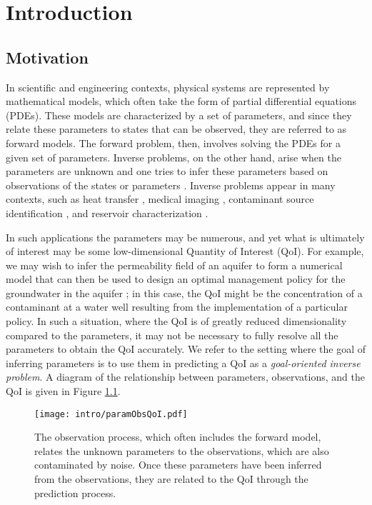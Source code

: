 \chapter{Introduction}

\section{Motivation}  %

In scientific and engineering contexts, physical systems are represented by mathematical models, which often take the form of partial differential equations (PDEs). These models are characterized by a set of parameters, and since they relate these parameters to states that can be observed, they are referred to as forward models. The forward problem, then, involves solving the PDEs for a given set of parameters. Inverse problems, on the other hand, arise when the parameters are unknown and one tries to infer these parameters based on observations of the states or parameters \cite{Taran05, BanksKuhn89}. Inverse problems appear in many contexts, such as heat transfer \cite{Alif94}, medical imaging \cite{Arr99,Ren10}, contaminant source identification \cite{Sun99}, and reservoir characterization \cite{OliReyLiu08}. 

In such applications the parameters may be numerous, and yet what is ultimately of interest may be some low-dimensional Quantity of Interest (QoI). For example, we may wish to infer the permeability field of an aquifer to form a numerical model that can then be used to design an optimal management policy for the groundwater in the aquifer \cite{Sun99}; in this case, the QoI might be the concentration of a contaminant at a water well resulting from the implementation of a particular policy. In such a situation, where the QoI is of greatly reduced dimensionality compared to the parameters, it may not be necessary to fully resolve all the parameters to obtain the QoI accurately. We refer to the setting where the goal of inferring parameters is to use them in predicting a QoI as a \textit{goal-oriented inverse problem}. A diagram of the relationship between parameters, observations, and the QoI is given in Figure \ref{fig:qdI}.

\begin{figure}[h]
\centering
\texttt{[image: intro/paramObsQoI.pdf]}
\caption{The observation process, which often includes the forward model, relates the unknown parameters to the observations, which are also contaminated by noise. Once these parameters have been inferred from the observations, they are related to the QoI through the prediction process.}
\label{fig:qdI}
\end{figure}

